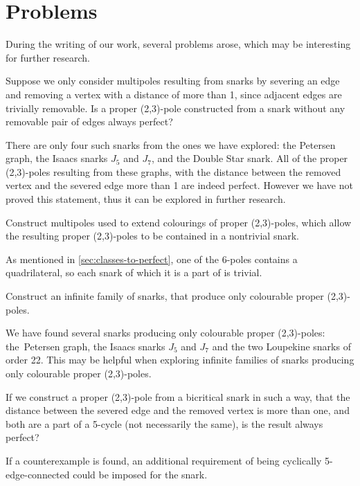 \section{Problems}
\label{sec:problems}

During the writing of our work, several problems arose, which may be interesting for further research.

\begin{problem}
	Suppose we only consider multipoles resulting from snarks by severing an edge and removing a vertex with a distance of more than 1, since adjacent edges are trivially removable. Is a proper (2,3)-pole constructed from a snark without any removable pair of edges always perfect?
\end{problem}

There are only four such snarks from the ones we have explored: the Petersen graph, the Isaacs snarks $J_5$ and $J_7$, and the Double Star snark. All of the proper (2,3)-poles resulting from these graphs, with the distance between the removed vertex and the severed edge more than 1 are indeed perfect. However we have not proved this statement, thus it can be explored in further research.

\begin{problem}
	Construct multipoles used to extend colourings of proper (2,3)-poles, which allow the resulting proper (2,3)-poles to be contained in a nontrivial snark.
\end{problem}

As mentioned in \cref{sec:classes-to-perfect}, one of the 6-poles contains a quadrilateral, so each snark of which it is a part of is trivial.

\begin{problem}
	Construct an infinite family of snarks, that produce only colourable proper (2,3)-poles.
\end{problem}

We have found several snarks producing only colourable proper (2,3)-poles: the~Petersen graph, the Isaacs snarks $J_5$ and $J_7$ and the two Loupekine snarks of order 22. This may be helpful when exploring infinite families of snarks producing only colourable proper (2,3)-poles.

\begin{problem}
	If we construct a proper (2,3)-pole from a bicritical snark in such a way, that the distance between the severed edge and the removed vertex is more than one, and both are a part of a 5-cycle (not necessarily the same), is the result always perfect?
\end{problem}

If a counterexample is found, an additional requirement of being cyclically 5-edge-connected could be imposed for the snark.